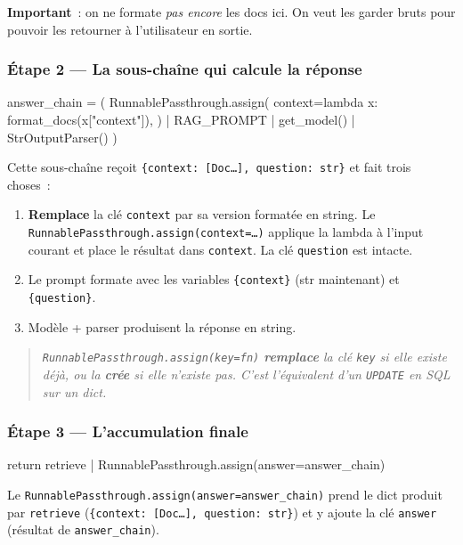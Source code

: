 \documentclass[11pt,a4paper]{article}
\begin{document}
\textbf{Important}~: on ne formate \emph{pas encore} les docs ici. On
veut les garder bruts pour pouvoir les retourner à l'utilisateur en
sortie.

\subsubsection*{Étape 2 — La sous-chaîne qui calcule la réponse}

\begin{pythoncode}
answer_chain = (
    RunnablePassthrough.assign(
        context=lambda x: format_docs(x["context"]),
    )
    | RAG_PROMPT | get_model() | StrOutputParser()
)
\end{pythoncode}

Cette sous-chaîne reçoit \texttt{\{context: [Doc\dots], question: str\}}
et fait trois choses~:

\begin{enumerate}[leftmargin=*]
  \item \textbf{Remplace} la clé \texttt{context} par sa version formatée
        en string. Le \texttt{RunnablePassthrough.assign(context=\dots)}
        applique la lambda à l'input courant et place le résultat dans
        \texttt{context}. La clé \texttt{question} est intacte.
  \item Le prompt formate avec les variables \texttt{\{context\}} (str
        maintenant) et \texttt{\{question\}}.
  \item Modèle + parser produisent la réponse en string.
\end{enumerate}

\begin{quote}\itshape
\texttt{RunnablePassthrough.assign(key=fn)} \textbf{remplace} la clé
\texttt{key} si elle existe déjà, ou la \textbf{crée} si elle n'existe
pas. C'est l'équivalent d'un \texttt{UPDATE} en SQL sur un dict.
\end{quote}

\subsubsection*{Étape 3 — L'accumulation finale}

\begin{pythoncode}
return retrieve | RunnablePassthrough.assign(answer=answer_chain)
\end{pythoncode}

Le \texttt{RunnablePassthrough.assign(answer=answer\_chain)} prend le
dict produit par \texttt{retrieve} (\texttt{\{context: [Doc\dots],
question: str\}}) et y ajoute la clé \texttt{answer} (résultat de
\texttt{answer\_chain}).
\end{document}
